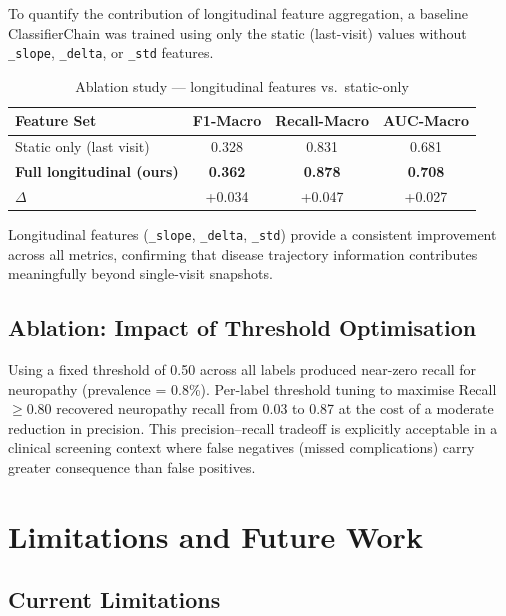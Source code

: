 \documentclass[12pt]{article}
\begin{document}
To quantify the contribution of longitudinal feature aggregation, a baseline
ClassifierChain was trained using only the static (last-visit) values without
\texttt{\_slope}, \texttt{\_delta}, or \texttt{\_std} features.

\begin{table}[H]
\centering
\caption{Ablation study --- longitudinal features vs.\ static-only}
\label{tab:ablation}
\begin{tabular}{lccc}
\toprule
\textbf{Feature Set} & \textbf{F1-Macro} & \textbf{Recall-Macro} & \textbf{AUC-Macro} \\
\midrule
Static only (last visit)          & 0.328 & 0.831 & 0.681 \\
\textbf{Full longitudinal (ours)} & \textbf{0.362} & \textbf{0.878} & \textbf{0.708} \\
\midrule
$\Delta$                          & +0.034 & +0.047 & +0.027 \\
\bottomrule
\end{tabular}
\end{table}

Longitudinal features (\texttt{\_slope}, \texttt{\_delta}, \texttt{\_std}) provide
a consistent improvement across all metrics, confirming that disease trajectory
information contributes meaningfully beyond single-visit snapshots.

\subsection{Ablation: Impact of Threshold Optimisation}

Using a fixed threshold of 0.50 across all labels produced near-zero recall for
neuropathy (prevalence = 0.8\%). Per-label threshold tuning to maximise
Recall $\geq 0.80$ recovered neuropathy recall from 0.03 to 0.87 at the cost
of a moderate reduction in precision. This precision--recall tradeoff is
explicitly acceptable in a clinical screening context where false negatives
(missed complications) carry greater consequence than false positives.


\section{Limitations and Future Work}

\subsection{Current Limitations}
\end{document}
